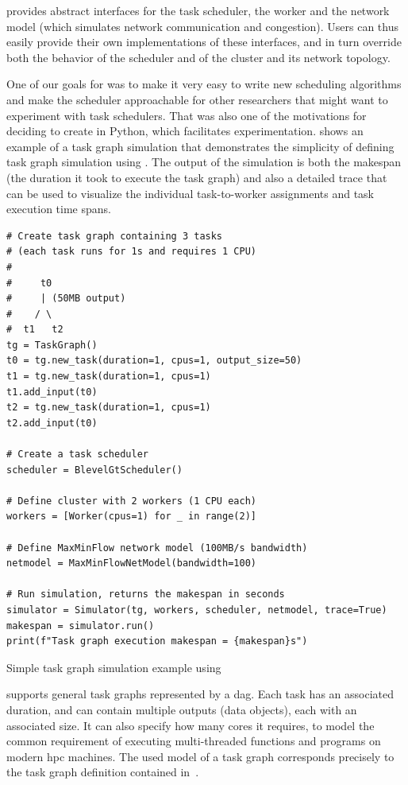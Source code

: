 \estee{} provides abstract interfaces for the task scheduler, the worker and the
network model (which simulates network communication and congestion). Users can thus easily provide
their own implementations of these interfaces, and in turn override both the behavior of the
scheduler and of the cluster and its network topology.

One of our goals for \estee{} was to make it very easy to write new scheduling
algorithms and make the scheduler approachable for other researchers that might want to experiment
with task schedulers. That was also one of the motivations for deciding to create
\estee{} in Python, which facilitates experimentation.  shows
an example of a task graph simulation that demonstrates the simplicity of defining task graph
simulation using \estee{}. The output of the simulation is both the makespan (the
duration it took to execute the task graph) and also a detailed trace that can be used to visualize
the individual task-to-worker assignments and task execution time spans.

\begin{listing}
	\begin{verbatim}
# Create task graph containing 3 tasks
# (each task runs for 1s and requires 1 CPU)
#
#     t0
#     | (50MB output)
#    / \
#  t1   t2
tg = TaskGraph()
t0 = tg.new_task(duration=1, cpus=1, output_size=50)
t1 = tg.new_task(duration=1, cpus=1)
t1.add_input(t0)
t2 = tg.new_task(duration=1, cpus=1)
t2.add_input(t0)

# Create a task scheduler
scheduler = BlevelGtScheduler()

# Define cluster with 2 workers (1 CPU each)
workers = [Worker(cpus=1) for _ in range(2)]

# Define MaxMinFlow network model (100MB/s bandwidth)
netmodel = MaxMinFlowNetModel(bandwidth=100)

# Run simulation, returns the makespan in seconds
simulator = Simulator(tg, workers, scheduler, netmodel, trace=True)
makespan = simulator.run()
print(f"Task graph execution makespan = {makespan}s")
    \end{verbatim}
	\caption{Simple task graph simulation example using \estee{}}
	\label{lst:estee-example}
\end{listing}

\estee{} supports general task graphs represented by a \gls{dag}.
Each task has an associated duration, and can contain multiple outputs (data objects), each with an
associated size. It can also specify how many cores it requires, to model the common
requirement of executing multi-threaded functions and programs on modern \gls{hpc}
machines. The used model of a task graph corresponds precisely to the task graph definition
contained in~\Autoref{ch:taskgraphs}.

